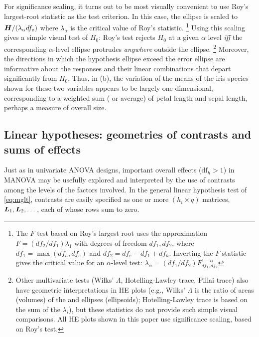 For significance scaling, it turns out to be most visually convenient to
use Roy's largest-root statistic as the test criterion.
In this case,
the  ellipse is scaled to $\bm{H}/(\lambda_\alpha df_e)$
where $\lambda_\alpha$ is the critical value of Roy's statistic.%
\footnote{
The $F$ test based on Roy's largest root uses the approximation
$ F = (df_2 / df_1) \lambda_1$ with degrees of freedom $df_1, df_2$,
where $df_1 = \max (df_h, df_e)$ and $df_2 = df_e - df_1 + df_h$.
Inverting the $F$ statistic gives the critical value for an $\alpha$-level test:
$\lambda_\alpha = (df_1/df_2) F^{1-\alpha}_{df_1,df_2}$
}
Using this scaling gives a simple visual test of
$H_0$: Roy's test rejects $H_0$ at a given $\alpha$ level \emph{iff}
the corresponding $\alpha$-level  ellipse protrudes \emph{anywhere} outside the 
ellipse.%
\footnote{Other multivariate tests (Wilks' $\Lambda$, Hotelling-Lawley trace,
Pillai trace) also have geometric interpretations
in HE plots (e.g.,  Wilks' $\Lambda$ is the ratio of areas (volumes)
of the  and  ellipses (ellipsoids); Hotelling-Lawley trace
is based on the sum of the $\lambda_i$), but these statistics do not provide
such simple visual comparisons. All HE plots shown in this paper use
significance scaling, based on Roy's test.
}
Moreover, the directions in which the hypothesis ellipse exceed the error ellipse
are informative about the responses and their linear combinations that depart significantly
from $H_0$.  Thus, in (b), the variation of the means of the iris species
shown for these two variables
appears to be largely one-dimensional, corresponding to a weighted sum ( or average) of petal length and
sepal length, perhaps a measure of overall size.


\subsection{Linear hypotheses: geometries of contrasts and sums of effects}

Just as in univariate ANOVA designs, important overall effects ($\textrm{df}_h>1$) in MANOVA may be usefully
explored and interpreted by the use of contrasts among the levels of the factors involved.
In the general linear hypothesis test of \eqref{eq:mglt}, contrasts are easily specified as one or more $(h_i \times q)$ 
matrices, $\bm{L}_1, \bm{L}_2, \dots $, each of whose rows sum to zero.

